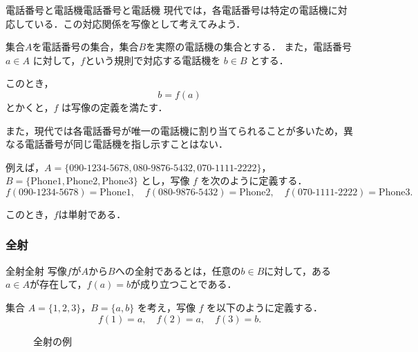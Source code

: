 \documentclass[a4paper,11pt]{ltjsarticle}
\begin{document}
\begin{example}{電話番号と電話機}{電話番号と電話機}
  現代では，各電話番号は特定の電話機に対応している．この対応関係を写像として考えてみよう．

  集合$A$を電話番号の集合，集合$B$を実際の電話機の集合とする．
  また，電話番号 $a \in A$ に対して，$f$という規則で対応する電話機を $b \in B$ とする．

  このとき，
  \[
  b = f(a)
  \]
  とかくと，$f$ は写像の定義を満たす．

  また，現代では各電話番号が唯一の電話機に割り当てられることが多いため，異なる電話番号が同じ電話機を指し示すことはない．
  
  例えば，$A = \{\text{090-1234-5678}, \text{080-9876-5432}, \text{070-1111-2222}\}$，
  $B = \{\text{Phone1}, \text{Phone2}, \text{Phone3}\}$ とし，写像 $f$ を次のように定義する．
  \[
  f(\text{090-1234-5678}) = \text{Phone1}, \quad 
  f(\text{080-9876-5432}) = \text{Phone2}, \quad 
  f(\text{070-1111-2222}) = \text{Phone3}.
  \]

  このとき，$f$は単射である．
\end{example}

\subsubsection{全射}

\begin{definition}{全射}{全射}
写像$f$が$A$から$B$への全射であるとは，任意の$b \in B$に対して，ある$a \in A$が存在して，$f(a) = b$が成り立つことである．
\end{definition}

集合 $A = \{1, 2, 3\}$，$B = \{a, b\}$ を考え，写像 $f$ を以下のように定義する．
\[
f(1) = a, \quad f(2) = a, \quad f(3) = b.
\]

\begin{figure}[h]
  \centering
  \caption{全射の例}
\end{figure}
\end{document}
